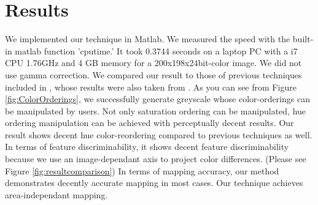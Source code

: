\documentclass{article}
\begin{document}
\section{Results}
 We implemented our technique in Matlab. We measured the speed with the built-in matlab function 'cputime.' It took 0.3744 seconds on a laptop PC with a i7 CPU 1.76GHz and 4 GB memory for a 200x198x24bit-color image. We did not use gamma correction. We compared our result to those of previous techniques included in \cite{kim09_c2g}, whose results were also taken from \cite{cadik08perceptual}. As you can see from Figure \ref{fig:ColorOrderings}, we successfully generate greyscale whose color-orderings can be manipulated by users. Not only saturation ordering can be manipulated, hue ordering manipulation can be achieved with perceptually decent results. Our result shows decent hue color-reordering compared to previous techniques as well. In terms of feature discriminability, it shows decent feature discriminability because we use an image-dependant axis to project color differences. (Please see Figure \ref{fig:resultcomparison}) In terms of mapping accuracy, our method demonstrates decently accurate mapping in most cases. Our technique achieves area-independant mapping.
\end{document}
